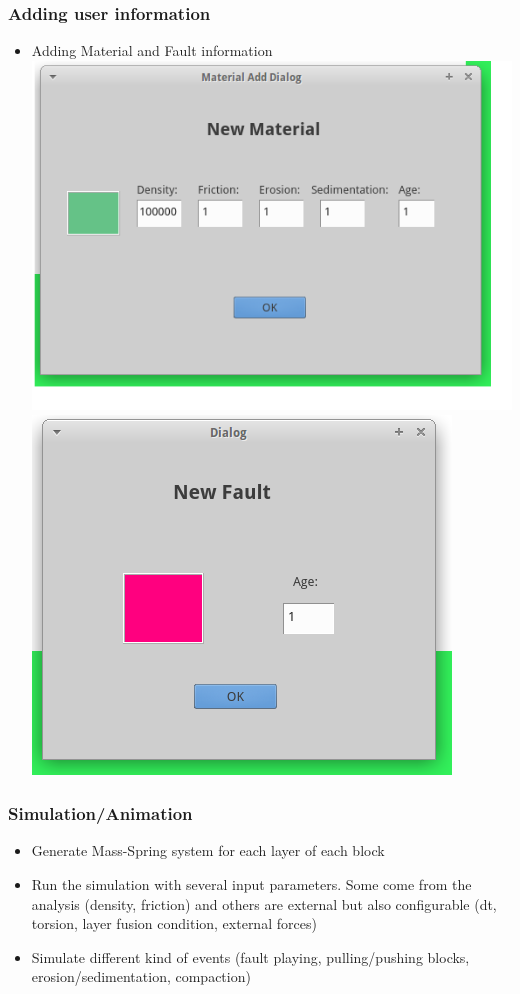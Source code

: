 \documentclass{beamer}
\begin{document}
	
	\begin{frame}
	\frametitle{Adding user information}
	\begin{itemize}
    \item Adding Material and Fault information
     \includegraphics[scale=0.3]{materialDialog.png}
     \includegraphics[scale=0.3]{faultDialog.png}
    \end{itemize}
	\end{frame}	
	
    \begin{frame}
	\frametitle{Simulation/Animation}
	\begin{itemize}
	\item Generate Mass-Spring system for each layer of each block 
	\item Run the simulation with several input parameters. Some come from the analysis (density, friction) and others are external but also configurable (dt, torsion, layer fusion condition, external forces)
	\item Simulate different kind of events (fault playing, pulling/pushing blocks, erosion/sedimentation, compaction)
	\end{itemize}
    \end{frame}
\end{document}
